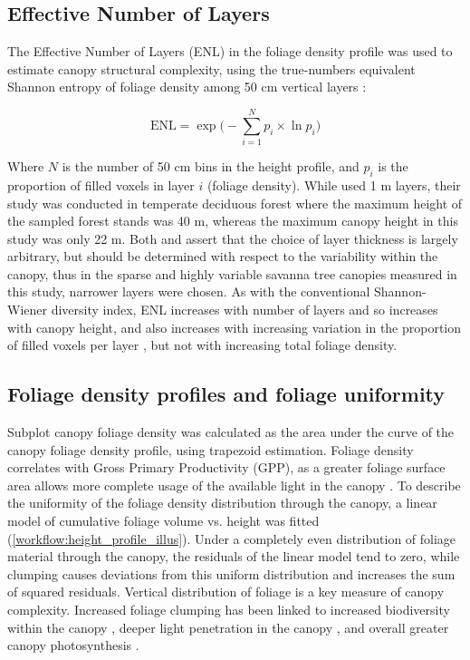 \begin{refsection}
\subsection{Effective Number of Layers}
\label{workflow:ssec:enl}

The Effective Number of Layers (ENL) in the foliage density profile was used to estimate canopy structural complexity, using the true-numbers equivalent Shannon entropy of foliage density among 50 cm vertical layers \citep{Ehbrecht2016}:

\begin{equation}
	\text{ENL} = \exp\Big(-\sum_{i=1}^{N} p_{i} \times \ln p_{i} \Big)
\end{equation}

Where $N$ is the number of 50 cm bins in the height profile, and $p_{i}$ is the proportion of filled voxels in layer $i$ (foliage density). While \citet{Ehbrecht2016} used 1 m layers, their study was conducted in temperate deciduous forest where the maximum height of the sampled forest stands was 40 m, whereas the maximum canopy height in this study was only 22 m. Both \citet{Ehbrecht2016} and \citet{Montes2004} assert that the choice of layer thickness is largely arbitrary, but should be determined with respect to the variability within the canopy, thus in the sparse and highly variable savanna tree canopies measured in this study, narrower layers were chosen. As with the conventional Shannon-Wiener diversity index, ENL increases with number of layers and so increases with canopy height, and also increases with increasing variation in the proportion of filled voxels per layer \citep{Jost2006}, but not with increasing total foliage density.

\subsection{Foliage density profiles and foliage uniformity}
\label{workflow:ssec:unif}

Subplot canopy foliage density was calculated as the area under the curve of the canopy foliage density profile, using trapezoid estimation. Foliage density correlates with Gross Primary Productivity (GPP), as a greater foliage surface area allows more complete usage of the available light in the canopy \citep{Kotchenova2004}. To describe the uniformity of the foliage density distribution through the canopy, a linear model of cumulative foliage volume vs. height was fitted (\autoref{workflow:height_profile_illus}). Under a completely even distribution of foliage material through the canopy, the residuals of the linear model tend to zero, while clumping causes deviations from this uniform distribution and increases the sum of squared residuals. Vertical distribution of foliage is a key measure of canopy complexity. Increased foliage clumping has been linked to increased biodiversity within the canopy \citep{Ishii2004}, deeper light penetration in the canopy \citep{Beland2021a}, and overall greater canopy photosynthesis \citep{Baldocchi1986, Beland2021a}.


\end{refsection}

